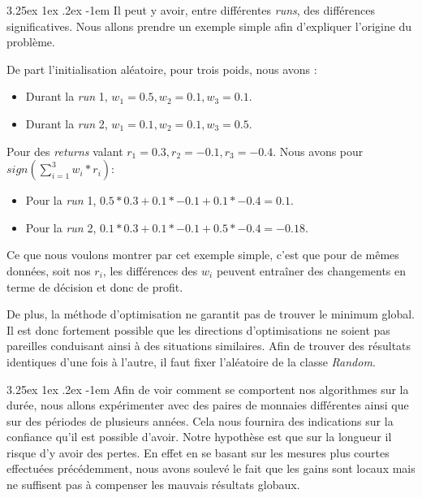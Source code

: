 \documentclass[a4paper, 11pt]{article}
\makeatletter
\renewcommand\paragraph{\@startsection{paragraph}{5}{\z@}%
  {3.25ex \@plus1ex \@minus.2ex}%
  {-1em}%
  {\normalfont\normalsize\bfseries}}
\makeatother
\begin{document}
\clearpage

\paragraph{}
Il peut y avoir, entre différentes \textit{runs}, des différences significatives. Nous allons prendre un exemple simple afin d'expliquer l'origine du problème.

De part l'initialisation aléatoire, pour trois poids, nous avons :
\begin{itemize}
	\item Durant la \textit{run} 1, $w_1=0.5,w_2=0.1,w_3=0.1$.
	\item Durant la \textit{run} 2, $w_1=0.1,w_2=0.1,w_3=0.5$.
\end{itemize}

Pour des \textit{returns} valant $r_1=0.3,r_2=-0.1,r_3=-0.4$. Nous avons pour $sign(\sum_{i=1}^{3}w_i * r_i)$:
\begin{itemize}
	\item Pour la \textit{run} 1, $0.5 * 0.3 + 0.1 * -0.1 + 0.1 * -0.4 = 0.1$.
	\item Pour la \textit{run} 2, $0.1 * 0.3 + 0.1 * -0.1 + 0.5 * -0.4 = -0.18$.
\end{itemize}

Ce que nous voulons montrer par cet exemple simple, c'est que pour de mêmes données, soit nos $r_i$, les différences des $w_i$ peuvent entraîner des changements en terme de décision et donc de profit.

De plus, la méthode d'optimisation ne garantit pas de trouver le minimum global. Il est donc fortement possible que les directions d'optimisations ne soient pas pareilles conduisant ainsi à des situations similaires. Afin de trouver des résultats identiques d'une fois à l'autre, il faut fixer l'aléatoire de la classe \textit{Random}.
 

\paragraph{}
Afin de voir comment se comportent nos algorithmes sur la durée, nous allons expérimenter avec des paires de monnaies différentes ainsi que sur des périodes de plusieurs années. Cela nous fournira des indications sur la confiance qu'il est possible d'avoir. Notre hypothèse est que sur la longueur il risque d'y avoir des pertes. En effet en se basant sur les mesures plus courtes effectuées précédemment, nous avons soulevé le fait que les gains sont locaux mais ne suffisent pas à compenser les mauvais résultats globaux.
\end{document}
